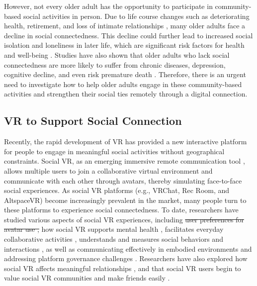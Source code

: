 However, not every older adult has the opportunity to participate in community-based social activities in person. Due to life course changes such as deteriorating health, retirement, and loss of intimate relationships \cite{coyle2012social,pugh2009social}, many older adults face a decline in social connectedness. This decline could further lead to increased social isolation and loneliness in later life, which are significant risk factors for health and well-being \cite{house1988social,nicholson2012review}. Studies have also shown that older adults who lack social connectedness are more likely to suffer from chronic diseases, depression, cognitive decline, and even risk premature death \cite{eng2002social,holt2021loneliness}. Therefore, there is an urgent need to investigate how to help older adults engage in these community-based activities and strengthen their social ties remotely through a digital connection. 

\subsection{VR to Support Social Connection}

Recently, the rapid development of VR has provided a new interactive platform for people to engage in meaningful social activities without geographical constraints. Social VR, as an emerging immersive remote communication tool \cite{li2021social}, allows multiple users to join a collaborative virtual environment and communicate with each other through avatars, thereby simulating face-to-face social experiences. As social VR platforms (e.g., VRChat, Rec Room, and AltspaceVR) become increasingly prevalent in the market, many people turn to these platforms to experience social connectedness. 
To date, researchers have studied various aspects of social VR experiences, including \sout{user preferences for avatar use \cite{gonzalez2018avatar},} how social VR supports mental health \cite{deighan2023social}, facilitates everyday collaborative activities \cite{freeman2022working}, understands and measures social behaviors and interactions \cite{mcveigh2018s,li2019measuring}, as well as communicating effectively in embodied environments and addressing platform governance challenges \cite{smith2018communication,blackwell2019harassment}. Researchers have also explored how social VR affects meaningful relationships \cite{zamanifard2019togetherness}, and that social VR users begin to value social VR communities and make friends easily \cite{piitulainen2022vibing}.

